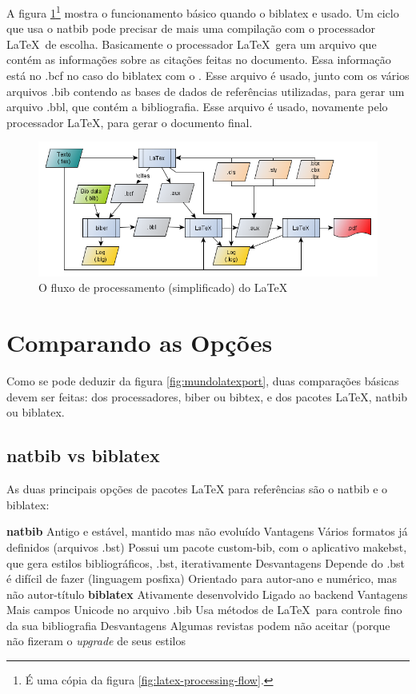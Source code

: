 A figura \ref{fig:latex-processing-flow2}\footnote{É uma cópia da figura \ref{fig:latex-processing-flow}.} mostra o funcionamento básico quando o biblatex e usado. Um ciclo que usa o natbib pode precisar de mais uma compilação com o processador \LaTeX\  de escolha. Basicamente o processador \LaTeX\   gera um arquivo que contém as informações sobre as citações feitas no documento. Essa informação está no .bcf no caso do biblatex com o . Esse arquivo é usado, junto com os vários arquivos .bib contendo as bases de dados de referências utilizadas, para gerar um arquivo .bbl, que contém a bibliografia. Esse arquivo é usado, novamente pelo processador \LaTeX, para gerar o documento final. 


\begin{figure}[hbt]
    \centering
    \includegraphics[width=0.8\linewidth]{"Images/LaTeX processing flow"}
    \caption{O fluxo de processamento (simplificado) do \LaTeX}
    \label{fig:latex-processing-flow2}
\end{figure}

\section{Comparando as Opções}

Como se pode deduzir da figura \ref{fig:mundolatexport}, duas comparações básicas devem ser feitas: dos processadores, biber ou bibtex, e dos pacotes \LaTeX, natbib ou biblatex.

\subsection{natbib vs biblatex}

As duas principais opções de pacotes \LaTeX   
para referências são o natbib e o biblatex:

\begin{outline}
    \1 \textbf{natbib}
    \2 Antigo e estável, mantido mas não evoluído
    \2 Vantagens
    \3 Vários formatos já definidos (arquivos .bst)
    \3 Possui um pacote custom-bib, com o aplicativo makebst, que gera estilos bibliográficos, .bst, iterativamente
    \2 Desvantagens
    \3 Depende do  
    \3 .bst é difícil de fazer (linguagem posfixa)
    \3 Orientado para autor-ano e numérico, mas não autor-título
    \1 \textbf{biblatex}
    \2 Ativamente desenvolvido
    \2 Ligado ao backend 
    \2 Vantagens
    \3 Mais campos
    \3 Unicode no arquivo .bib
    \3 Usa métodos de \LaTeX\ para controle fino da sua bibliografia
    \2 Desvantagens
    \3 Algumas revistas podem não aceitar (porque não fizeram o \textit{upgrade} de seus estilos
\end{outline}



